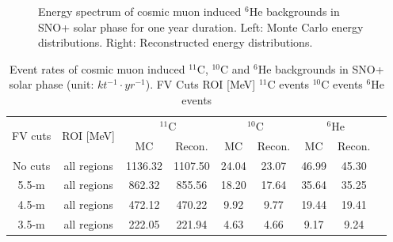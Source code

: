 \begin{figure}[htbp]
	\caption{Energy spectrum of cosmic muon induced $^{6}$He backgrounds in SNO+ solar phase for one year duration. Left: Monte Carlo energy distributions. Right: Reconstructed energy distributions.}
	\label{muonSolarHe6}
\end{figure}


\begin{table}[ht]
	\caption{Event rates of cosmic muon induced $^{11}$C, $^{10}$C and $^6$He backgrounds in SNO+ solar phase (unit: $kt^{-1}\cdot yr^{-1}$). FV Cuts ROI [MeV] $^{11}$C events $^{10}$C events $^{6}$He events}
	\centering
	\begin{tabular*}{150mm}{c@{\extracolsep{\fill}}cccccccc}
		\toprule
		\multirow{2}{*}{FV cuts} & \multirow{2}{*}{ROI [MeV]} & \multicolumn{2}{c}{$^{11}$C} & \multicolumn{2}{c}{$^{10}$C} & \multicolumn{2}{c}{$^{6}$He}\\
		\cline{3-4}  \cline{5-6} \cline{7-8}
		&  & MC & Recon.& MC& Recon.& MC& Recon.\\
		\midrule
		No cuts & all regions &  1136.32 & 1107.50 & 24.04& 23.07& 46.99& 45.30\\
		5.5-m & all regions & 862.32& 855.56& 18.20& 17.64& 35.64& 35.25\\
		4.5-m & all regions & 472.12&470.22& 9.92& 9.77& 19.44& 19.41\\
		3.5-m & all regions & 222.05& 221.94& 4.63& 4.66& 9.17& 9.24\\
		\bottomrule		
	\end{tabular*}\label{muon_eventrates2}
\end{table}
